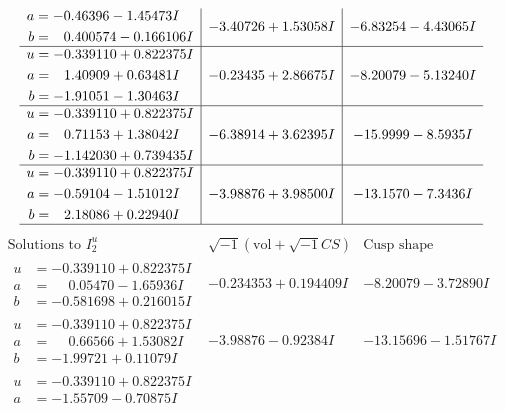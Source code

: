 \documentclass[1p]{elsarticle_modified}
\theoremstyle{definition}
\newcommand{\I}{\sqrt{-1}}
\begin{document}
$$\begin{array}{c|c|c}
\begin{aligned}
a &= -0.46396 - 1.45473 I \\
b &= \phantom{-}0.400574 - 0.166106 I\end{aligned}
 & -3.40726 + 1.53058 I & -6.83254 - 4.43065 I \\ \hline\begin{aligned}
u &= -0.339110 + 0.822375 I \\
a &= \phantom{-}1.40909 + 0.63481 I \\
b &= -1.91051 - 1.30463 I\end{aligned}
 & -0.23435 + 2.86675 I & -8.20079 - 5.13240 I \\ \hline\begin{aligned}
u &= -0.339110 + 0.822375 I \\
a &= \phantom{-}0.71153 + 1.38042 I \\
b &= -1.142030 + 0.739435 I\end{aligned}
 & -6.38914 + 3.62395 I & -15.9999 - 8.5935 I \\ \hline\begin{aligned}
u &= -0.339110 + 0.822375 I \\
a &= -0.59104 - 1.51012 I \\
b &= \phantom{-}2.18086 + 0.22940 I\end{aligned}
 & -3.98876 + 3.98500 I & -13.1570 - 7.3436 I\\
 \hline 
 \end{array}$$\newpage$$\begin{array}{c|c|c}  
\text{Solutions to }I^u_{2}& \I (\text{vol} + \sqrt{-1}CS) & \text{Cusp shape}\\
 \hline 
\begin{aligned}
u &= -0.339110 + 0.822375 I \\
a &= \phantom{-}0.05470 - 1.65936 I \\
b &= -0.581698 + 0.216015 I\end{aligned}
 & -0.234353 + 0.194409 I & -8.20079 - 3.72890 I \\ \hline\begin{aligned}
u &= -0.339110 + 0.822375 I \\
a &= \phantom{-}0.66566 + 1.53082 I \\
b &= -1.99721 + 0.11079 I\end{aligned}
 & -3.98876 - 0.92384 I & -13.15696 - 1.51767 I \\ \hline\begin{aligned}
u &= -0.339110 + 0.822375 I \\
a &= -1.55709 - 0.70875 I \\

\end{aligned}
\end{array}$$
\end{document}
